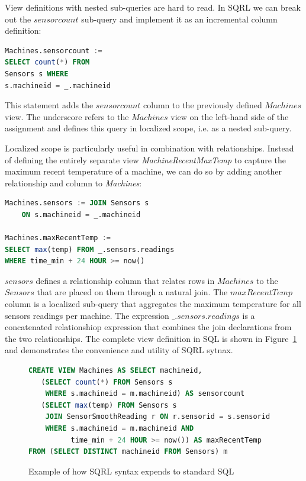 \documentclass[	DIV=calc,%
							paper=letter,%
							fontsize=11pt,%
							twocolumn]{scrartcl}	 					%
\begin{document}
View definitions with nested sub-queries are hard to read. In SQRL we can break out the $sensorcount$ sub-query and implement it as an incremental column definition:
\begin{lstlisting}[language=SQL]
Machines.sensorcount :=
SELECT count(*) FROM
Sensors s WHERE
s.machineid = _.machineid
\end{lstlisting}

This statement adds the $sensorcount$ column to the previously defined $Machines$ view. The underscore refers to the $Machines$ view on the left-hand side of the assignment and defines this query in localized scope, i.e. as a nested sub-query.

Localized scope is particularly useful in combination with relationships. Instead of defining the entirely separate view \emph{MachineRecentMaxTemp} to capture the maximum recent temperature of a machine, we can do so by adding another relationship and column to \emph{Machines}:

\begin{lstlisting}[language=SQL]
Machines.sensors := JOIN Sensors s
    ON s.machineid = _.machineid

Machines.maxRecentTemp :=
SELECT max(temp) FROM _.sensors.readings
WHERE time_min + 24 HOUR >= now()
\end{lstlisting}

$sensors$ defines a relationship column that relates rows in $Machines$ to the $Sensors$ that are placed on them through a natural join. The $maxRecentTemp$ column is a localized sub-query that aggregates the maximum temperature for all sensors readings per machine. The expression $\_.sensors.readings$ is a concatenated relationshiop expression that combines the join declarations from the two relationships.
The complete view definition in SQL is shown in Figure~\ref{fig:machinesView} and demonstrates the convenience and utility of SQRL sytnax.

\begin{figure}
\begin{lstlisting}[language=SQL]
CREATE VIEW Machines AS SELECT machineid,
   (SELECT count(*) FROM Sensors s
    WHERE s.machineid = m.machineid) AS sensorcount
   (SELECT max(temp) FROM Sensors s
    JOIN SensorSmoothReading r ON r.sensorid = s.sensorid
    WHERE s.machineid = m.machineid AND
          time_min + 24 HOUR >= now()) AS maxRecentTemp
FROM (SELECT DISTINCT machineid FROM Sensors) m
\end{lstlisting}
\caption{Example of how SQRL syntax expends to standard SQL}
\label{fig:machinesView}
\end{figure}
\end{document}
